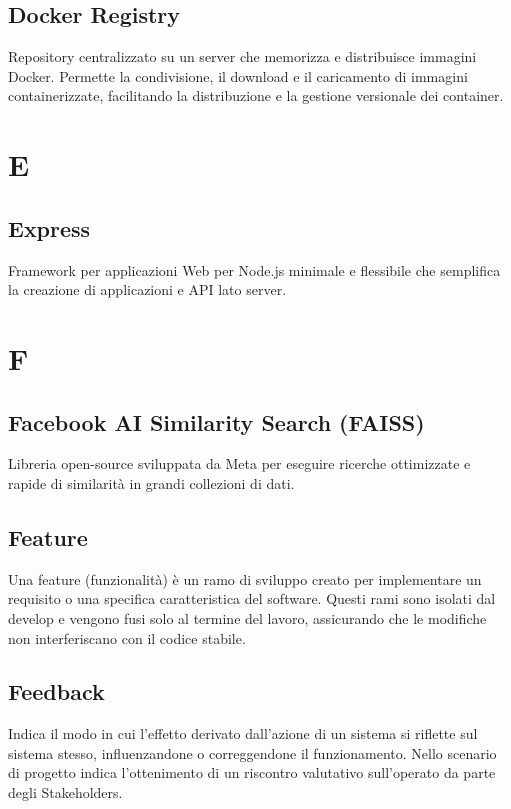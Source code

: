 \documentclass[10pt, letterpaper]{article}
\begin{document}
\subsection*{Docker Registry}
Repository centralizzato su un server che memorizza e distribuisce immagini Docker.
Permette la condivisione, il download e il caricamento di immagini containerizzate, facilitando
la distribuzione e la gestione versionale dei container.

\section{E}

\subsection*{Express}
Framework per applicazioni Web per Node.js minimale e flessibile che semplifica la creazione di applicazioni e API lato server.

\section{F}

\subsection*{Facebook AI Similarity Search (FAISS)}
Libreria open-source sviluppata da Meta per eseguire ricerche ottimizzate e rapide di similarità in grandi collezioni di dati.

\subsection*{Feature}
Una feature (funzionalità) è un ramo di sviluppo creato per implementare un requisito o una specifica caratteristica del software. Questi rami sono isolati dal
develop e vengono fusi solo al termine del lavoro, assicurando che le modifiche non interferiscano con il codice stabile.

\subsection*{Feedback}
Indica il modo in cui l'effetto derivato dall'azione di un sistema si riflette sul sistema stesso, influenzandone o correggendone il funzionamento. Nello
scenario di progetto indica l'ottenimento di un riscontro valutativo sull'operato da parte degli Stakeholders.
\end{document}
